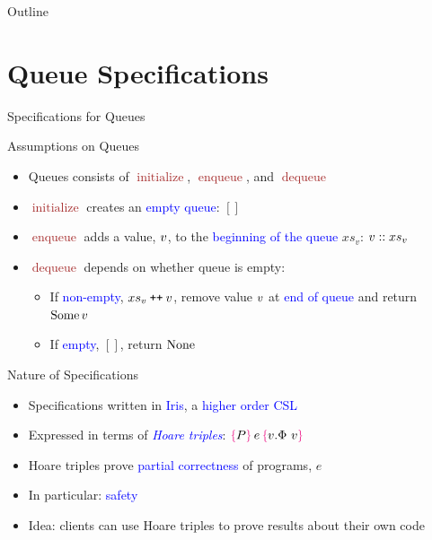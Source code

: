 \documentclass[9pt,xcolor={dvipsnames}]{beamer}
\newcommand{\initialise}{\operatorname{initialize}}
\newcommand{\enqueue}{\operatorname{enqueue}}
\newcommand{\dequeue}{\operatorname{dequeue}}
\newcommand{\absvalue}{\val}
\newcommand{\absvalueList}{xs_v}
\newcommand\catenate{\mathbin{\text{\ttfamily\upshape ++}}}
\begin{document}
\begin{frame}{Outline}
  \tableofcontents
\end{frame}


\section{Queue Specifications}

\begin{frame}{Specifications for Queues}
  \begin{block}{Assumptions on Queues}
    \begin{itemize}
      \item Queues consists of \textcolor{Brown}{$\initialise$}, \textcolor{Brown}{$\enqueue$}, and \textcolor{Brown}{$\dequeue$}
      \item \textcolor{Brown}{$\initialise$} creates an \textcolor{blue}{empty queue}: $[]$
      \item \textcolor{Brown}{$\enqueue$} adds a value, $\absvalue$, to the \textcolor{blue}{beginning of the queue} $\absvalueList$: $\absvalue :: \absvalueList$
      \item \textcolor{Brown}{$\dequeue$} depends on whether queue is empty:
        \begin{itemize}
          \item If \textcolor{blue}{non-empty}, $\absvalueList \catenate \absvalue$, remove value $\absvalue$ at \textcolor{blue}{end of queue} and return \textcolor{blue}{$\Some \absvalue$}
          \item If \textcolor{blue}{empty}, $[]$, return \textcolor{blue}{$\operatorname{None}$}
        \end{itemize}
    \end{itemize}
  \end{block}
  \pause
  \begin{block}{Nature of Specifications}
    \begin{itemize}
      \item Specifications written in \textcolor{blue}{Iris}, a \textcolor{blue}{higher order CSL}
      \item Expressed in terms of \textcolor{blue}{\textit{Hoare triples}}: $\hoare{P}{e}{v. \Phi ~ v}$
      \item Hoare triples prove \textcolor{blue}{partial correctness} of programs, $e$
      \item In particular: \textcolor{blue}{safety}
      \item Idea: clients can use Hoare triples to prove results about their own code
    \end{itemize}
  \end{block}
\end{frame}
\end{document}
